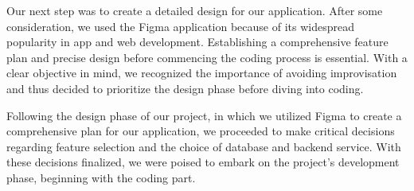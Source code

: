 \par
Our next step was to create a detailed design for our application. After some consideration, we used the Figma application because of its widespread popularity in app and web development. Establishing a comprehensive feature plan and precise design before commencing the coding process is essential. With a clear objective in mind, we recognized the importance of avoiding improvisation and thus decided to prioritize the design phase before diving into coding.
\par
Following the design phase of our project, in which we utilized Figma to create a comprehensive plan for our application, we proceeded to make critical decisions regarding feature selection and the choice of database and backend service. With these decisions finalized, we were poised to embark on the project's development phase, beginning with the coding part. 
